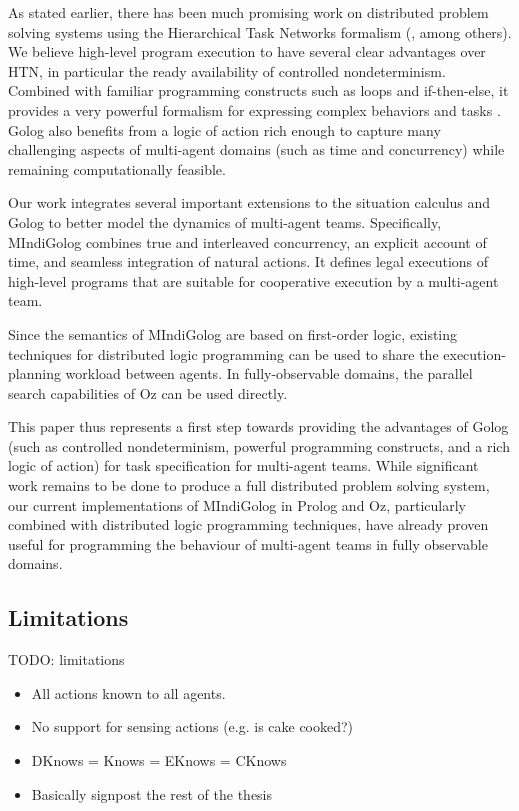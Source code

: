 As stated earlier, there has been much promising work on distributed
problem solving systems using the Hierarchical Task Networks formalism
(\citet{tambe97flexible_teamwork,decker95designing_coordination,grosz99planning_together},
among others). We believe high-level program execution to have several
clear advantages over HTN, in particular the ready availability of
controlled nondeterminism. Combined with familiar programming constructs
such as loops and if-then-else, it provides a very powerful formalism
for expressing complex behaviors and tasks \citet{Gabaldon02htn_in_golog,son00htn_golog}.
Golog also benefits from a logic of action rich enough to capture
many challenging aspects of multi-agent domains (such as time and
concurrency) while remaining computationally feasible.

Our work integrates several important extensions to the situation
calculus and Golog to better model the dynamics of multi-agent teams.
Specifically, MIndiGolog combines true and interleaved concurrency,
an explicit account of time, and seamless integration of natural actions.
It defines legal executions of high-level programs that are suitable
for cooperative execution by a multi-agent team.

Since the semantics of MIndiGolog are based on first-order logic,
existing techniques for distributed logic programming can be used
to share the execution-planning workload between agents. In fully-observable
domains, the parallel search capabilities of Oz can be used directly. 

This paper thus represents a first step towards providing the advantages
of Golog (such as controlled nondeterminism, powerful programming
constructs, and a rich logic of action) for task specification for
multi-agent teams. While significant work remains to be done to produce
a full distributed problem solving system, our current implementations
of MIndiGolog in Prolog and Oz, particularly combined with distributed
logic programming techniques, have already proven useful for programming
the behaviour of multi-agent teams in fully observable domains.


\subsection{Limitations}



TODO: limitations

\begin{itemize}
\item All actions known to all agents. 
\item No support for sensing actions (e.g. is cake cooked?) 
\item DKnows = Knows = EKnows = CKnows 
\item Basically signpost the rest of the thesis 
\end{itemize}
